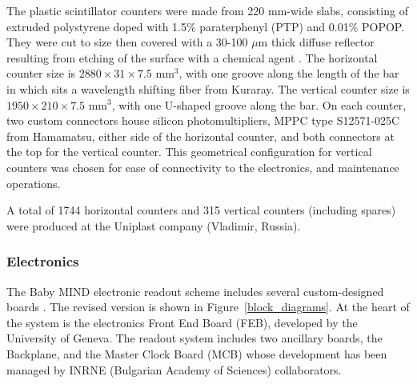 The plastic scintillator counters were made from 220 mm-wide slabs, consisting of extruded polystyrene doped with 1.5\% paraterphenyl (PTP) and 0.01\% POPOP. They were cut to size then covered with a 30-100 $\mu$m thick diffuse reflector resulting from etching of the surface with a chemical agent \cite{Kudenko:2001qj, Mineev:2011xp}. The horizontal counter size is $2880 \times 31 \times 7.5 $ mm$^3$, with one groove along the length of the bar in which sits a wavelength shifting fiber from Kuraray. The vertical counter size is $1950 \times 210 \times 7.5 $ mm$^3$, with one U-shaped groove along the bar. On each counter, two custom connectors house silicon photomultipliers, MPPC type S12571-025C from Hamamatsu, either side of the horizontal counter, and both connectors at the top for the vertical counter. This geometrical configuration for vertical counters was chosen for ease of connectivity to the electronics, and maintenance operations.

A total of 1744 horizontal counters and 315 vertical counters (including spares) were produced at the Uniplast company (Vladimir, Russia).

\subsubsection{Electronics}
The Baby MIND electronic readout scheme includes several custom-designed boards \cite{Noah:2016ikh}. The revised version is shown in Figure~\ref{block_diagrams}. At the heart of the system is the electronics Front End Board (FEB), developed by the University of Geneva. The readout system includes two ancillary boards, the Backplane, and the Master Clock Board (MCB) whose development has been managed by INRNE (Bulgarian Academy of Sciences) collaborators.




